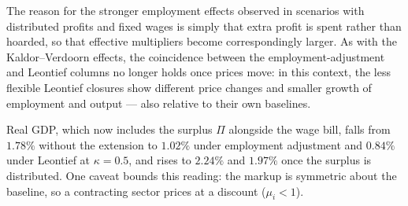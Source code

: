 The reason for the stronger employment effects observed in scenarios with distributed profits and fixed wages is simply that extra profit is spent rather than hoarded, so that effective multipliers become correspondingly larger. As with the Kaldor--Verdoorn effects, the coincidence between the employment-adjustment and Leontief columns no longer holds once prices move: in this context, the less flexible Leontief closures show different price changes and smaller growth of employment and output --- also relative to their own baselines.

Real GDP, which now includes the surplus $\Pi$ alongside the wage bill, falls from $1.78\%$ without the extension to $1.02\%$ under employment adjustment and $0.84\%$ under Leontief at $\kappa = 0.5$, and rises to $2.24\%$ and $1.97\%$ once the surplus is distributed. One caveat bounds this reading: the markup is symmetric about the baseline, so a contracting sector prices at a discount ($\mu_i < 1$).


